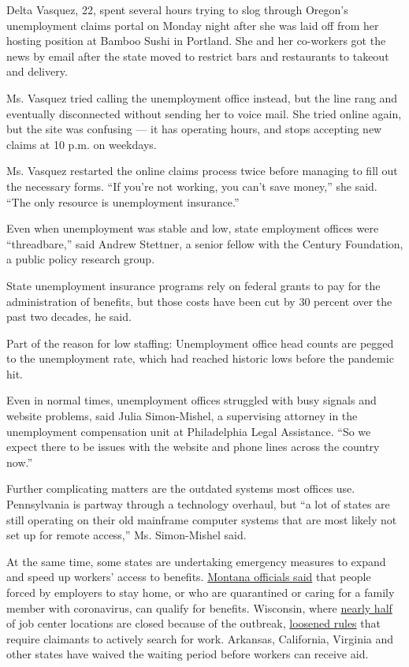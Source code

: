 Delta Vasquez, 22, spent several hours trying to slog through Oregon's
unemployment claims portal on Monday night after she was laid off from
her hosting position at Bamboo Sushi in Portland. She and her co-workers
got the news by email after the state moved to restrict bars and
restaurants to takeout and delivery.

Ms. Vasquez tried calling the unemployment office instead, but the line
rang and eventually disconnected without sending her to voice mail. She
tried online again, but the site was confusing --- it has operating
hours, and stops accepting new claims at 10 p.m. on weekdays.

Ms. Vasquez restarted the online claims process twice before managing to
fill out the necessary forms. ``If you're not working, you can't save
money,'' she said. ``The only resource is unemployment insurance.''

Even when unemployment was stable and low, state employment offices were
``threadbare,'' said Andrew Stettner, a senior fellow with the Century
Foundation, a public policy research group.

State unemployment insurance programs rely on federal grants to pay for
the administration of benefits, but those costs have been cut by 30
percent over the past two decades, he said.

Part of the reason for low staffing: Unemployment office head counts are
pegged to the unemployment rate, which had reached historic lows before
the pandemic hit.

Even in normal times, unemployment offices struggled with busy signals
and website problems, said Julia Simon-Mishel, a supervising attorney in
the unemployment compensation unit at Philadelphia Legal Assistance.
``So we expect there to be issues with the website and phone lines
across the country now.''

Further complicating matters are the outdated systems most offices use.
Pennsylvania is partway through a technology overhaul, but ``a lot of
states are still operating on their old mainframe computer systems that
are most likely not set up for remote access,'' Ms. Simon-Mishel said.

At the same time, some states are undertaking emergency measures to
expand and speed up workers' access to benefits.
\href{http://governor.mt.gov/pressroom/governor-bullock-announces-emergency-rules-to-streamline-unemployment-benefits-for-workers-impacted-by-covid-19}{Montana
officials said} that people forced by employers to stay home, or who are
quarantined or caring for a family member with coronavirus, can qualify
for benefits. Wisconsin, where
\href{https://dwd.wisconsin.gov/covid19/public/det.htm}{nearly half} of
job center locations are closed because of the outbreak,
\href{https://dwd.wisconsin.gov/news/2020/200317-emergency-order.htmhttps://content.govdelivery.com/accounts/WIGOV/bulletins/281f868}{loosened
rules} that require claimants to actively search for work. Arkansas,
California, Virginia and other states have waived the waiting period
before workers can receive aid.


